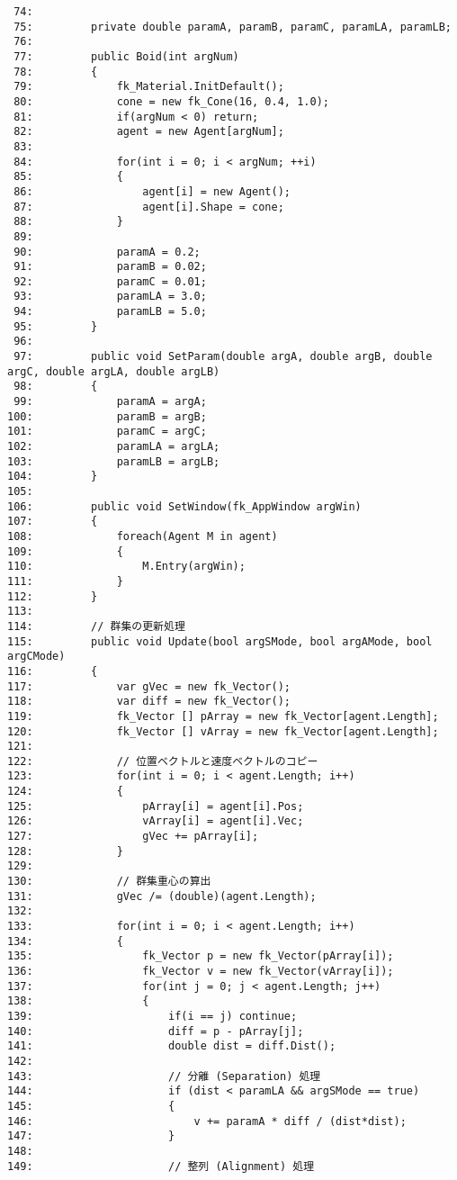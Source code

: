 \begin{breakbox}
\begin{small}
\begin{verbatim}
 74: 
 75:         private double paramA, paramB, paramC, paramLA, paramLB;
 76: 
 77:         public Boid(int argNum)
 78:         {
 79:             fk_Material.InitDefault();
 80:             cone = new fk_Cone(16, 0.4, 1.0);
 81:             if(argNum < 0) return;
 82:             agent = new Agent[argNum];
 83: 
 84:             for(int i = 0; i < argNum; ++i)
 85:             {
 86:                 agent[i] = new Agent();
 87:                 agent[i].Shape = cone;
 88:             }
 89: 
 90:             paramA = 0.2;
 91:             paramB = 0.02;
 92:             paramC = 0.01;
 93:             paramLA = 3.0;
 94:             paramLB = 5.0;
 95:         }
 96: 
 97:         public void SetParam(double argA, double argB, double argC, double argLA, double argLB)
 98:         {
 99:             paramA = argA;
100:             paramB = argB;
101:             paramC = argC;
102:             paramLA = argLA;
103:             paramLB = argLB;
104:         }
105: 
106:         public void SetWindow(fk_AppWindow argWin)
107:         {
108:             foreach(Agent M in agent)
109:             {
110:                 M.Entry(argWin);
111:             }
112:         }
113: 
114:         // 群集の更新処理
115:         public void Update(bool argSMode, bool argAMode, bool argCMode)
116:         {
117:             var gVec = new fk_Vector();
118:             var diff = new fk_Vector();
119:             fk_Vector [] pArray = new fk_Vector[agent.Length];
120:             fk_Vector [] vArray = new fk_Vector[agent.Length];
121: 
122:             // 位置ベクトルと速度ベクトルのコピー
123:             for(int i = 0; i < agent.Length; i++)
124:             {
125:                 pArray[i] = agent[i].Pos;
126:                 vArray[i] = agent[i].Vec;
127:                 gVec += pArray[i];
128:             }
129: 
130:             // 群集重心の算出
131:             gVec /= (double)(agent.Length);
132: 
133:             for(int i = 0; i < agent.Length; i++)
134:             {
135:                 fk_Vector p = new fk_Vector(pArray[i]);
136:                 fk_Vector v = new fk_Vector(vArray[i]);
137:                 for(int j = 0; j < agent.Length; j++)
138:                 {
139:                     if(i == j) continue;
140:                     diff = p - pArray[j];
141:                     double dist = diff.Dist();
142: 
143:                     // 分離 (Separation) 処理
144:                     if (dist < paramLA && argSMode == true)
145:                     {
146:                         v += paramA * diff / (dist*dist);
147:                     }
148: 
149:                     // 整列 (Alignment) 処理

\end{verbatim}
\end{small}
\end{breakbox}
